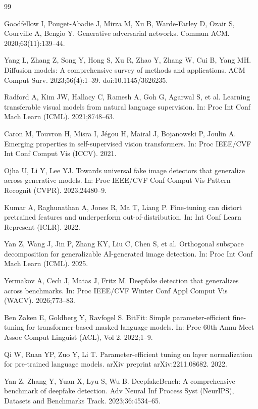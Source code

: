 \documentclass[fonts]{icst}
\begin{document}
\begin{thebibliography}{99}
\balance

Goodfellow I, Pouget-Abadie J, Mirza M, Xu B, Warde-Farley D, Ozair S, Courville A, Bengio Y.
Generative adversarial networks.
Commun ACM. 2020;63(11):139--44.

Yang L, Zhang Z, Song Y, Hong S, Xu R, Zhao Y, Zhang W, Cui B, Yang MH.
Diffusion models: A comprehensive survey of methods and applications.
ACM Comput Surv. 2023;56(4):1--39. doi:10.1145/3626235.

Radford A, Kim JW, Hallacy C, Ramesh A, Goh G, Agarwal S, et al.
Learning transferable visual models from natural language supervision.
In: Proc Int Conf Mach Learn (ICML). 2021;8748--63.

Caron M, Touvron H, Misra I, J{\'e}gou H, Mairal J, Bojanowski P, Joulin A.
Emerging properties in self-supervised vision transformers.
In: Proc IEEE/CVF Int Conf Comput Vis (ICCV). 2021.

Ojha U, Li Y, Lee YJ.
Towards universal fake image detectors that generalize across generative models.
In: Proc IEEE/CVF Conf Comput Vis Pattern Recognit (CVPR). 2023;24480--9.

Kumar A, Raghunathan A, Jones R, Ma T, Liang P.
Fine-tuning can distort pretrained features and underperform out-of-distribution.
In: Int Conf Learn Represent (ICLR). 2022.

Yan Z, Wang J, Jin P, Zhang KY, Liu C, Chen S, et al.
Orthogonal subspace decomposition for generalizable AI-generated image detection.
In: Proc Int Conf Mach Learn (ICML). 2025.

Yermakov A, Cech J, Matas J, Fritz M.
Deepfake detection that generalizes across benchmarks.
In: Proc IEEE/CVF Winter Conf Appl Comput Vis (WACV). 2026;773--83.

Ben Zaken E, Goldberg Y, Ravfogel S.
BitFit: Simple parameter-efficient fine-tuning for transformer-based masked language models.
In: Proc 60th Annu Meet Assoc Comput Linguist (ACL), Vol 2. 2022;1--9.

Qi W, Ruan YP, Zuo Y, Li T.
Parameter-efficient tuning on layer normalization for pre-trained language models.
arXiv preprint arXiv:2211.08682. 2022.

Yan Z, Zhang Y, Yuan X, Lyu S, Wu B.
DeepfakeBench: A comprehensive benchmark of deepfake detection.
Adv Neural Inf Process Syst (NeurIPS), Datasets and Benchmarks Track. 2023;36:4534--65.


\end{thebibliography}
\end{document}
